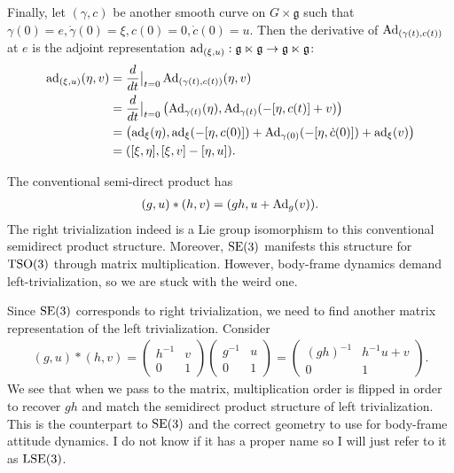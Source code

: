 \documentclass[12pt,class=article,crop=false]{standalone}
\begin{document}
Finally, let $ (\gamma, c)$ be another smooth curve on $ G \times  \mathfrak{g}$ such that $ \gamma(0) = e, \dot{ \gamma}(0) = \xi, c(0) =0, \dot{c}(0) = u$. Then the derivative of $ \operatorname{Ad}_{ ( \gamma(t), c(t))}$ at $ e$ is the adjoint representation $ \operatorname{ad}_{ (\xi, u)}: \mathfrak{g} \ltimes \mathfrak{g} \to \mathfrak{g} \ltimes \mathfrak{g} $:
\begin{align*}
	\operatorname{ad}_{ (\xi,u)}(\eta, v) &= \frac{d}{dt}\big|_{t= 0} \operatorname{Ad}_{ ( \gamma(t), c(t))}( \eta,v ) \\
				&= \frac{d}{dt}\big|_{t= 0} \left( \operatorname{Ad}_{ \gamma(t)}( \eta), \operatorname{Ad}_{ \gamma(t)}( -[\eta, c(t)] + v) \right)    \\
				&= \left( \operatorname{ad}_{ \xi}(\eta), \operatorname{ad}_{ \xi} (-[\eta,c(0)]) + \operatorname{Ad}_{ \gamma(0)}( - [\eta, \dot{c}(0)] ) + \operatorname{ad}_{ \xi}(v) \right)   \\
				&= ([ \xi, \eta], [\xi, v] - [\eta, u]) .
\end{align*}
\begin{remark}
The conventional semi-direct product has 
\begin{align*}
	(g,u) * (h,v) = (gh,u + \operatorname{Ad}_g(v)).
\end{align*}
The right trivialization indeed is a Lie group isomorphism to this conventional semidirect product structure. Moreover, $ \operatorname{SE}(3)$ manifests this structure for $ \operatorname{TSO}(3)$ through matrix multiplication. However, body-frame dynamics demand left-trivialization, so we are stuck with the weird one.
\end{remark}

Since $ \operatorname{SE}(3)$ corresponds to right trivialization, we need to find another matrix representation of the left trivialization. Consider
 \begin{align*}
	 (g,u) * (h,v) = \begin{pmatrix} h^{-1} & v\\0&1 \end{pmatrix} \begin{pmatrix} g^{-1} & u\\0&1 \end{pmatrix} = \begin{pmatrix} (gh)^{-1} & h^{-1}u +v \\ 0 & 1\end{pmatrix}. 
\end{align*}
We see that when we pass to the matrix, multiplication order is flipped in order to recover $ gh$ and match the semidirect product structure of left trivialization. This is the counterpart to  $ \operatorname{SE}(3)$ and the correct geometry to use for body-frame attitude dynamics. I do not know if it has a proper name so I will just refer to it as $ \operatorname{LSE}(3)$.
\end{document}
